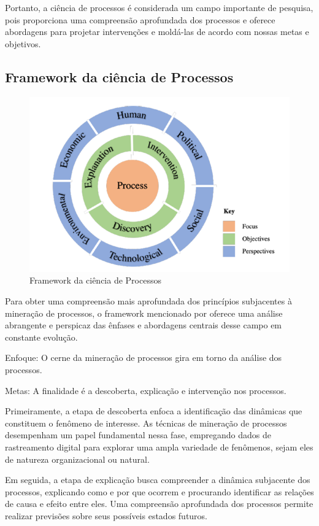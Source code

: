 \documentclass[tcc2]{classe_uftex/uftex}
\begin{document}
Portanto, a ciência de processos é considerada um campo importante de pesquisa, pois proporciona uma compreensão aprofundada dos processos e oferece abordagens para projetar intervenções e moldá-las de acordo com nossas metas e objetivos.
 \cite{vom2021process}
 

\subsection{Framework da ciência de Processos 
}
\begin{figure}[h]
    \centering
    \includegraphics[width=12cm]{tcc_example/image-700x471.png}
    \caption{Framework da ciência de Processos \cite{vom2021process}}
\end{figure}

Para obter uma compreensão mais aprofundada dos princípios subjacentes à mineração de processos, o framework mencionado por \cite{vom2021process} oferece uma análise abrangente e perspicaz das ênfases e abordagens centrais desse campo em constante evolução. 

Enfoque: O cerne da mineração de processos gira em torno da análise dos processos.

Metas: A finalidade é a descoberta, explicação e intervenção nos processos.

Primeiramente, a etapa de descoberta enfoca a identificação das dinâmicas que constituem o fenômeno de interesse. As técnicas de mineração de processos desempenham um papel fundamental nessa fase, empregando dados de rastreamento digital para explorar uma ampla variedade de fenômenos, sejam eles de natureza organizacional ou natural.\cite{chia1999rhizomic}

Em seguida, a etapa de explicação busca compreender a dinâmica subjacente dos processos, explicando como e por que ocorrem e procurando identificar as relações de causa e efeito entre eles. Uma compreensão aprofundada dos processos permite realizar previsões sobre seus possíveis estados futuros.\cite{lazer2020computational}
\end{document}
